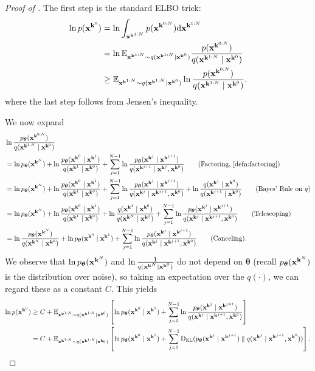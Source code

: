 \begin{proof}[Proof of ] The first step is the standard ELBO trick:
\begin{align*}
\ln p({\mathbf{x}}^{\mathbf{k}^0}) &= \ln \int_{{\mathbf{x}}^{\mathbf{k}^{1:N}}}p({\mathbf{x}}^{\mathbf{k}^{0:N}})\mathrm{d} {\mathbf{x}}^{\mathbf{k}^{1:N}}\\
&= \ln \mathbb{E}_{{\mathbf{x}}^{\mathbf{k}^{1:N}} \sim q({\mathbf{x}}^{\mathbf{k}^{1:N}} \mid {\mathbf{x}}^{\mathbf{k}^0})}\frac{p({\mathbf{x}}^{\mathbf{k}^{0:N}})}{q({\mathbf{x}}^{\mathbf{k}^{1:N}} \mid {\mathbf{x}}^{\mathbf{k}^0})}\\
&\ge \mathbb{E}_{{\mathbf{x}}^{\mathbf{k}^{1:N}} \sim q({\mathbf{x}}^{\mathbf{k}^{1:N}}   \mid {\mathbf{x}}^{\mathbf{k}^0})} \ln \frac{p({\mathbf{x}}^{\mathbf{k}^{0:N}})}{q({\mathbf{x}}^{\mathbf{k}^{1:N}} \mid {\mathbf{x}}^{\mathbf{k}^0})}.
\end{align*}
where the last step follows from Jensen's inequality.


We now expand
\begin{align*}
&\ln \frac{ \ptheta(\bx^{\bk^{0:N}} )}{q(\bx^{\bk^{1:N}} \mid \bx^{\bk^0})} \\
&= \ln  \ptheta (\bx^{\bk^N}) + \ln \frac{\ptheta(\bx^{\bk^0} \mid \bx^{\bk^1})}{q(\bx^{\bk^1} \mid \bx^{\bk^0})} + \sum_{j=1}^{N-1}\ln \frac{\ptheta(\bx^{\bk^{j}} \mid \bx^{\bk^{j+1}})}{q(\bx^{\bk^{j+1}} \mid \bx^{\bk^{j}},\bx^{\bk^0})} \tag{Factoring, \Cref{defn:factoring}}\\
&= \ln  \ptheta (\bx^{\bk^N}) + \ln \frac{\ptheta(\bx^{\bk^0} \mid \bx^{\bk^1})}{q(\bx^{\bk^1} \mid \bx^{\bk^0})} + \sum_{j=1}^{N-1}\ln \frac{\ptheta(\bx^{\bk^{j}} \mid \bx^{\bk^{j+1}})}{q(\bx^{\bk^{j}} \mid \bx^{\bk^{j+1}},\bx^{\bk^0})} + \ln \frac{q(\bx^{\bk^{j}} \mid \bx^{\bk^0})}{q(\bx^{\bk^{j+1}} \mid \bx^{\bk^0})} \tag{Bayes' Rule on $q$}\\
&= \ln  \ptheta (\bx^{\bk^N}) + \ln \frac{\ptheta(\bx^{\bk^0} \mid \bx^{\bk^1})}{q(\bx^{\bk^1} \mid \bx^{\bk^0})} +  \ln \frac{q(\bx^{\bk^{1}} \mid \bx^{\bk^0})}{q(\bx^{\bk^{N}} \mid \bx^{\bk^0})} +  \sum_{j=1}^{N-1}\ln \frac{\ptheta(\bx^{\bk^{j}} \mid \bx^{\bk^{j+1}})}{q(\bx^{\bk^{j}} \mid \bx^{\bk^{j+1}},\bx^{\bk^0})} \tag{Telescoping}\\
&=\ln \frac{ \ptheta (\bx^{\bk^N})}{q(\bx^{\bk^{N}} \mid \bx^{\bk^0})} + \ln \ptheta(\bx^{\bk^0} \mid \bx^{\bk^1}) +  \sum_{j=1}^{N-1}\ln \frac{\ptheta(\bx^{\bk^{j}} \mid \bx^{\bk^{j+1}})}{q(\bx^{\bk^{j}} \mid \bx^{\bk^{j+1}},\bx^{\bk^0})} \tag{Canceling}.
\end{align*}
We observe that $\ln  p_{\bm{\theta}} ({\mathbf{x}}^{\mathbf{k}^N})$ and $  \ln \frac{1}{q({\mathbf{x}}^{\mathbf{k}^{N}} \mid {\mathbf{x}}^{\mathbf{k}^0})}$ do not depend on $\bm{\theta}$ (recall $p_{\bm{\theta}} ({\mathbf{x}}^{\mathbf{k}^N})$ is the distribution over noise), so taking an expectation over the $q(\cdot)$, we can regard these as a constant $C$. This yields
\begin{align*}
\ln p({\mathbf{x}}^{\mathbf{k}^0}) &\ge C + \mathbb{E}_{{\mathbf{x}}^{\mathbf{k}^{1:N}} \sim q({\mathbf{x}}^{\mathbf{k}^{1:N}}   \mid {\mathbf{x}}^{\mathbf{k}^0})}\left[  \ln {p_{\bm{\theta}}({\mathbf{x}}^{\mathbf{k}^0} \mid {\mathbf{x}}^{\mathbf{k}^1})}  +  \sum_{j=1}^{N-1} \ln \frac{p_{\bm{\theta}}({\mathbf{x}}^{\mathbf{k}^{j}} \mid {\mathbf{x}}^{\mathbf{k}^{j+1}})}{q({\mathbf{x}}^{\mathbf{k}^{j}} \mid {\mathbf{x}}^{\mathbf{k}^{j+1}},{\mathbf{x}}^{\mathbf{k}^0})} \right]\\
&= C + \mathbb{E}_{{\mathbf{x}}^{\mathbf{k}^{1:N}} \sim q({\mathbf{x}}^{\mathbf{k}^{1:N}}\mid {\mathbf{x}}^{\mathbf{k}_0})}\left[\ln {p_{\bm{\theta}}({\mathbf{x}}^{\mathbf{k}^0} \mid {\mathbf{x}}^{\mathbf{k}^1})} + \sum_{j=1}^{N-1} \mathrm{D}_{\mathbb{KL}}({p_{\bm{\theta}}({\mathbf{x}}^{\mathbf{k}^{j}} \mid {\mathbf{x}}^{\mathbf{k}^{j+1}})}\parallel {q({\mathbf{x}}^{\mathbf{k}^{j}} \mid {\mathbf{x}}^{\mathbf{k}^{j+1}},{\mathbf{x}}^{\mathbf{k}^0})})\right].
\end{align*}


\end{proof}
